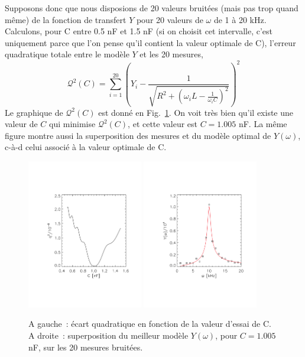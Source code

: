 Supposons donc que nous disposions de 20 valeurs bruitées (mais pas trop quand même) de la fonction de transfert $Y$ pour 20 valeurs de $\omega$ de 1 à 20 kHz. Calculons, pour C entre 0.5 nF et 1.5 nF (si on choisit cet intervalle, c'est uniquement parce que l'on pense qu'il contient la valeur optimale de C), l'erreur quadratique totale entre le modèle $Y$ et les 20 mesures,
\begin{equation}
\mathcal{Q}^2(C)=\sum_{i=1}^{20} \left(Y_i-\frac{1}{\sqrt{R^2+\left(\omega_i L-\frac{1}{\omega_i C}\right)^2}}\right)^2
\end{equation}
Le graphique de $\mathcal{Q}^2(C)$ est donné en Fig.~\ref{fig:q2c}. On voit très bien qu'il existe une valeur de $C$ qui minimise $\mathcal{Q}^2(C)$, et cette valeur est $C=1.005$ nF. La même figure montre aussi la superposition des mesures et du modèle optimal de $Y(\omega)$, c-à-d celui associé à la valeur optimale de C.
\begin{figure}[htb]
   \centering
   \includegraphics[width=0.45\textwidth]{assets/figures/q2Ymodel.pdf}\hspace{7mm}
   \includegraphics[width=0.45\textwidth]{assets/figures/adjustedModelYtf.pdf}
   \caption{A gauche~: écart quadratique en fonction de la valeur d'essai de C. A droite~: superposition du meilleur modèle $Y(\omega)$, pour $C=1.005$ nF, sur les 20 mesures bruitées.}
   \label{fig:q2c}
\end{figure}

